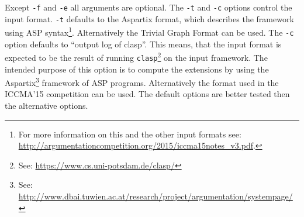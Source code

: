 \documentclass[parskip=half]{scrartcl}
\begin{document}
Except \texttt{-f} and \texttt{-e} all arguments are optional.  The \texttt{-t}
and \texttt{-c} options control the input format. \texttt{-t} defaults to the
Aspartix format, which describes the framework using ASP syntax\footnote{For
    more information on this and the other input formats see:
\url{http://argumentationcompetition.org/2015/iccma15notes_v3.pdf}.}.
Alternatively the Trivial Graph Format can be used. The \texttt{-c} option
defaults to ``output log of clasp''. This means, that the input format is
expected to be the result of running \texttt{clasp}\footnote{See:
\url{https://www.cs.uni-potsdam.de/clasp/}} on the input framework. The intended
purpose of this option is to compute the extensions by using the
Aspartix\footnote{See:
\url{http://www.dbai.tuwien.ac.at/research/project/argumentation/systempage/}}
framework of ASP programs. Alternatively the format used in the ICCMA'15
competition can be used. The default options are better tested then the
alternative options.
\end{document}
